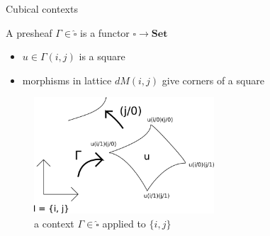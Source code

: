 \documentclass[english, draft]{beamer}
\begin{document}
\begin{frame}{Cubical contexts}
 

    \begin{example}
        A presheaf $\Gamma \in \widehat{\square}$ is a functor $\square \rightarrow \mathbf{Set}$

        \begin{itemize}
            \item $u \in \Gamma (i,j)$ is a square

            \item morphisms in lattice $dM(i,j)$ give corners of a square

        \end{itemize}
        \begin{figure}
            
            \includegraphics[width=0.6\textwidth]{figures/context}
            
            \caption{a context $\Gamma \in \widehat{\square}$ applied to $\{i,j\}$}
        \end{figure}
    \end{example}
 
\end{frame}
\end{document}
